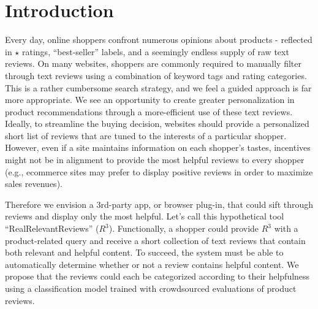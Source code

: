 \documentclass[10pt, a4paper, twocolumn]{article}
\begin{document}

\twocolumn[
  \begin{@twocolumnfalse}
    \maketitle
    \begin{abstract}
      \abstractText
      \newline
      \newline
    \end{abstract}
  \end{@twocolumnfalse}
]


\section{Introduction}

Every day, online shoppers confront numerous opinions about products - reflected in $\star$ ratings, “best-seller” labels, and a seemingly endless supply of raw text reviews. On many websites, shoppers are commonly required to manually filter through text reviews using a combination of keyword tags and rating categories. This is a rather cumbersome search strategy, and we feel a guided approach is far more appropriate. We see an opportunity to create greater personalization in product recommendations through a more-efficient use of these text reviews. Ideally, to streamline the buying decision, websites should provide a personalized short list of reviews that are tuned to the interests of a particular shopper. However, even if a site maintains information on each shopper’s tastes, incentives might not be in alignment to provide the most helpful reviews to every shopper (e.g., ecommerce sites may prefer to display positive reviews in order to maximize sales revenues).

Therefore we envision a 3rd-party app, or browser plug-in, that could sift through reviews and display only the most helpful. Let’s call this hypothetical tool “RealRelevantReviews” ($R^3$). Functionally, a shopper could provide $R^3$ with a product-related query and receive a short collection of text reviews that contain both relevant and helpful content. To succeed, the system must be able to automatically determine whether or not a review contains helpful content. We propose that the reviews could each be categorized according to their helpfulness using a classification model trained with crowdsourced evaluations of product reviews.
\end{document}
